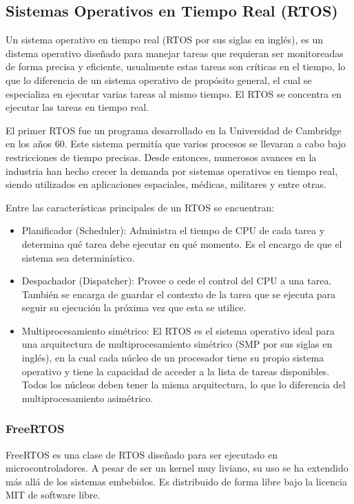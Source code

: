 \subsection{Sistemas Operativos en Tiempo Real (RTOS)} 

Un sistema operativo en tiempo real (RTOS por sus siglas en inglés), es un distema operativo diseñado para manejar tareas que requieran ser monitoreadas de forma precisa y eficiente, usualmente estas tareas son críticas en el tiempo, lo que lo diferencia de un sistema operativo de propósito general, el cual se especializa en ejecutar varias tareas al mismo tiempo. El RTOS se concentra en ejecutar las tareas en tiempo real.

El primer RTOS fue un programa desarrollado en la Universidad de Cambridge en los años 60. Este sistema permitía que varios procesos se llevaran a cabo bajo restricciones de tiempo precisas. Desde entonces, numerosos avances en la industria han hecho crecer la demanda por sistemas operativos en tiempo real, siendo utilizados en aplicaciones espaciales, médicas, militares y entre otras.

Entre las características principales de un RTOS se encuentran:

\begin{itemize}
    \item Planificador (Scheduler): Administra el tiempo de CPU de cada tarea y determina qué tarea debe ejecutar en qué momento. Es el encargo de que el sistema sea determinístico.
    \item Despachador (Dispatcher): Provee o cede el control del CPU a una tarea. También se encarga de guardar el contexto de la tarea que se ejecuta para seguir su ejecución la próxima vez que esta se utilice.
    \item Multiprocesamiento simétrico: El RTOS es el sistema operativo ideal para una arquitectura de multiprocesamiento simétrico (SMP por sus siglas en inglés), en la cual cada núcleo de un procesador tiene su propio sistema operativo y tiene la capacidad de acceder a la lista de tareas disponibles. Todos los núcleos deben tener la misma arquitectura, lo que lo diferencia del multiprocesamiento asimétrico.
\end{itemize}

\subsubsection{FreeRTOS} FreeRTOS es una clase de RTOS diseñado para ser ejecutado en microcontroladores. A pesar de ser un kernel muy liviano, su uso se ha extendido más allá de los sistemas embebidos. Es distribuido de forma libre bajo la licencia MIT de software libre.

